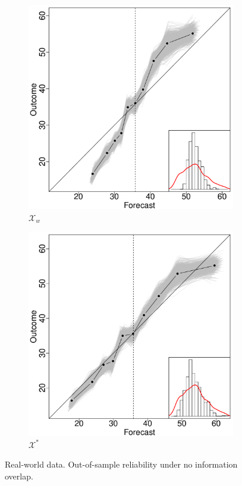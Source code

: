 \documentclass[11pt]{article}
\theoremstyle{definition}
\theoremstyle{definition}
\begin{document}
\begin{figure}
\begin{subfigure}[b]{0.323\textwidth}
                \includegraphics[width=\textwidth]{IndependentOLP}
                \caption{$\mathcal{X}_w$}
                \label{fig:gull}
        \end{subfigure}%
         \begin{subfigure}[b]{0.323\textwidth}
                \includegraphics[width=\textwidth]{IndependentE-OLP}
                \caption{$\mathcal{X}^*$}
                \label{RelDiagramNoE}
             \end{subfigure}
          \caption{Real-world data. Out-of-sample reliability under no information overlap. }
           \label{RelDiagramNo}
\end{figure}
\end{document}
